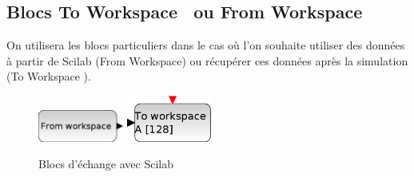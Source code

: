 \subsection{Blocs \og To Workspace \fg~ou \og From Workspace\fg}
On utilisera les blocs particuliers dans le cas où l'on souhaite 
utiliser des données à partir de Scilab (\og From Workspace\fg) 
ou récupérer ces données après la simulation (\og To Workspace \fg).

\begin{figure}[!h]
    \centering
    \includegraphics[width=0.25\textwidth]{fig/FROMWSB.eps}\hspace{3cm}
    \includegraphics[width=0.25\textwidth]{fig/TOWS_c.eps}
    \caption{Blocs d'échange avec Scilab\label{fig-workspace}}
\end{figure}
